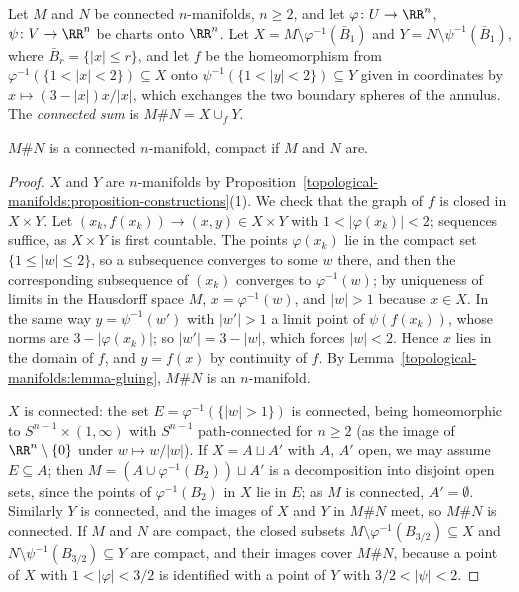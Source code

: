 \begin{definition}\label{topological-manifolds:definition-connected-sum}
Let $M$ and $N$ be connected $n$-manifolds, $n \geq 2$, and let $\varphi \colon U \to \RR^n$, $\psi \colon V \to \RR^n$ be charts onto $\RR^n$. Let $X = M \setminus \varphi^{-1}(\bar B_1)$ and $Y = N \setminus \psi^{-1}(\bar B_1)$, where
$\bar B_r = \{|x| \leq r\}$, and let $f$ be the homeomorphism from $\varphi^{-1}(\{1 < |x| < 2\}) \subseteq X$ onto $\psi^{-1}(\{1 < |y| < 2\}) \subseteq Y$ given in coordinates by $x \mapsto (3 - |x|)x/|x|$, which exchanges the two
boundary spheres of the annulus. The \emph{connected sum} is $M \# N = X \cup_fY$.
\end{definition}

\begin{proposition}\label{topological-manifolds:proposition-connected-sum}
$M \# N$ is a connected $n$-manifold, compact if $M$ and $N$ are.
\end{proposition}

\begin{proof}
$X$ and $Y$ are $n$-manifolds by Proposition~\ref{topological-manifolds:proposition-constructions}(1). We check that the graph of $f$ is closed in $X \times Y$. Let $(x_k, f(x_k)) \to (x, y) \in X \times Y$ with
$1 < |\varphi(x_k)| < 2$; sequences suffice, as $X \times Y$ is first countable. The points $\varphi(x_k)$ lie in the compact set $\{1 \leq |w| \leq 2\}$, so a subsequence converges to some $w$ there, and then the corresponding
subsequence of $(x_k)$ converges to $\varphi^{-1}(w)$; by uniqueness of limits in the Hausdorff space $M$, $x = \varphi^{-1}(w)$, and $|w| > 1$ because $x \in X$. In the same way $y = \psi^{-1}(w')$ with $|w'| > 1$ a limit point of
$\psi(f(x_k))$, whose norms are $3 - |\varphi(x_k)|$; so $|w'| = 3 - |w|$, which forces $|w| < 2$. Hence $x$ lies in the domain of $f$, and $y = f(x)$ by continuity of $f$. By Lemma~\ref{topological-manifolds:lemma-gluing},
$M \# N$ is an $n$-manifold.

$X$ is connected: the set $E = \varphi^{-1}(\{|w| > 1\})$ is connected, being homeomorphic to $S^{n-1} \times (1, \infty)$ with $S^{n-1}$ path-connected for $n \geq 2$ (as the image of $\RR^n \setminus \{0\}$ under $w \mapsto w/|w|$). If $X = A \sqcup A'$
with $A$, $A'$ open, we may assume $E \subseteq A$; then $M = (A \cup \varphi^{-1}(B_2)) \sqcup A'$ is a decomposition into disjoint open sets, since the points of $\varphi^{-1}(B_2)$ in $X$ lie in $E$; as $M$ is connected, $A' = \emptyset$.
Similarly $Y$ is connected, and the images of $X$ and $Y$ in $M \# N$ meet, so $M \# N$ is connected. If $M$ and $N$ are compact, the closed subsets $M \setminus \varphi^{-1}(B_{3/2}) \subseteq X$ and
$N \setminus \psi^{-1}(B_{3/2}) \subseteq Y$ are compact, and their images cover $M \# N$, because a point of $X$ with $1 < |\varphi| < 3/2$ is identified with a point of $Y$ with $3/2 < |\psi| < 2$.
\end{proof}

